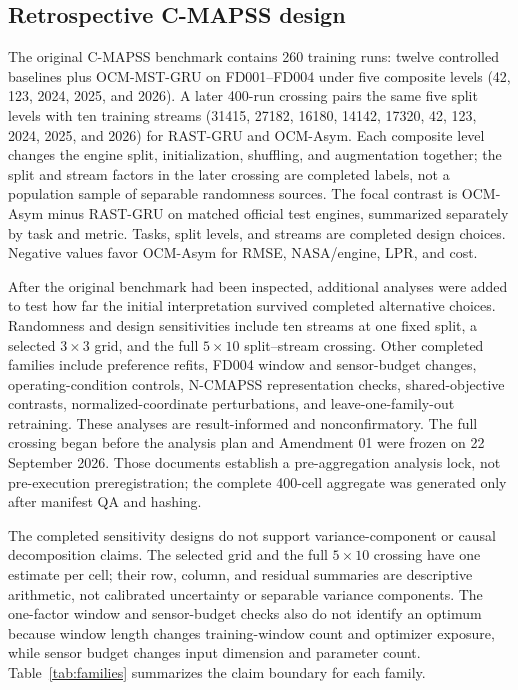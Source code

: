 \documentclass[preprint,12pt,numbers,sort&compress]{elsarticle}
\begin{document}
\subsection{Retrospective C-MAPSS design}

The original C-MAPSS benchmark contains 260 training runs: twelve controlled baselines plus OCM-MST-GRU on FD001--FD004 under five composite levels (42, 123, 2024, 2025, and 2026). A later 400-run crossing pairs the same five split levels with ten training streams (31415, 27182, 16180, 14142, 17320, 42, 123, 2024, 2025, and 2026) for RAST-GRU and OCM-Asym. Each composite level changes the engine split, initialization, shuffling, and augmentation together; the split and stream factors in the later crossing are completed labels, not a population sample of separable randomness sources. The focal contrast is OCM-Asym minus RAST-GRU on matched official test engines, summarized separately by task and metric. Tasks, split levels, and streams are completed design choices. Negative values favor OCM-Asym for RMSE, NASA/engine, LPR, and cost.


After the original benchmark had been inspected, additional analyses were added to test how far the initial interpretation survived completed alternative choices. Randomness and design sensitivities include ten streams at one fixed split, a selected $3\times3$ grid, and the full $5\times10$ split--stream crossing. Other completed families include preference refits, FD004 window and sensor-budget changes, operating-condition controls, N-CMAPSS representation checks, shared-objective contrasts, normalized-coordinate perturbations, and leave-one-family-out retraining. These analyses are result-informed and nonconfirmatory. The full crossing began before the analysis plan and Amendment 01 were frozen on 22 September 2026. Those documents establish a pre-aggregation analysis lock, not pre-execution preregistration; the complete 400-cell aggregate was generated only after manifest QA and hashing.

The completed sensitivity designs do not support variance-component or causal decomposition claims. The selected grid and the full $5\times10$ crossing have one estimate per cell; their row, column, and residual summaries are descriptive arithmetic, not calibrated uncertainty or separable variance components. The one-factor window and sensor-budget checks also do not identify an optimum because window length changes training-window count and optimizer exposure, while sensor budget changes input dimension and parameter count. Table~\ref{tab:families} summarizes the claim boundary for each family.
\end{document}
